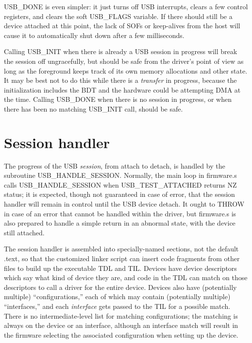USB\_DONE is even simpler:  it just turns off USB interrupts, clears a few
control registers, and clears the soft USB\_FLAGS variable.  If there should
still be a device attached at this point, the lack of SOFs or keep-alives
from the host will cause it to automatically shut down after a few
milliseconds.

Calling USB\_INIT when there is already a USB session in progress will break
the session off ungracefully, but should be safe from the driver's point of
view as long as the foreground keeps track of its own memory allocations and
other state.  It may be best not to do this while there is a \emph{transfer}
in progress, because the initialization includes the BDT and the hardware
could be attempting DMA at the time.  Calling USB\_DONE when there is no
session in progress, or when there has been no matching USB\_INIT call,
should be safe.

\section{Session handler}

The progress of the USB \emph{session}, from attach to detach, is handled by
the subroutine USB\_HANDLE\_SESSION.  Normally, the main loop in firmware.s
calls USB\_HANDLE\_SESSION when USB\_TEST\_ATTACHED returns NZ status; it is
expected, though not guaranteed in case of error, that the session handler
will remain in control until the USB device detach.  It ought to THROW in
case of an error that cannot be handled within the driver, but firmware.s is
also prepared to handle a simple return in an abnormal state, with the
device still attached.

The session handler is assembled into specially-named sections, not the
default .text, so that the customized linker script can insert code
fragments from other files to build up the executable TDL and TIL.  Devices
have device descriptors which say what kind of device they are, and code in
the TDL can match on those descriptors to call a driver for the entire
device.  Devices also have (potentially multiple) ``configurations,'' each
of which may contain (potentially multiple) ``interfaces,'' and each
\emph{interface} gets passed to the TIL for a possible match.  There is no
intermediate-level list for matching configurations; the matching is always
on the device or an interface, although an interface match will result in
the firmware selecting the associated configuration when setting up the
device.

